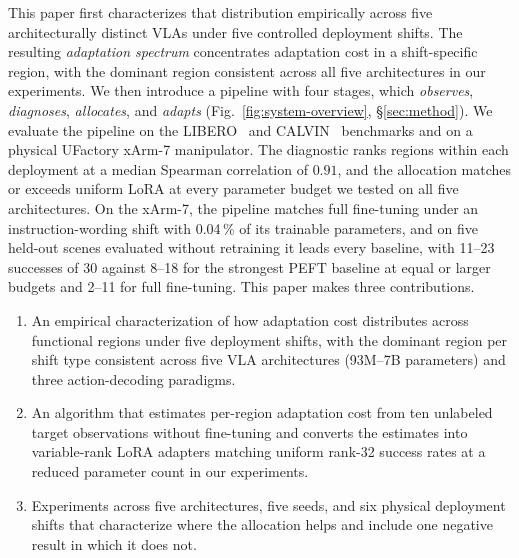 This paper first characterizes that distribution empirically across five architecturally distinct VLAs under five controlled deployment shifts.
The resulting \emph{adaptation spectrum} concentrates adaptation cost in a shift-specific region, with the dominant region consistent across all five architectures in our experiments.
We then introduce a pipeline with four stages, which \emph{observes}, \emph{diagnoses}, \emph{allocates}, and \emph{adapts} (Fig.~\ref{fig:system-overview}, \S\ref{sec:method}).
We evaluate the pipeline on the LIBERO~\cite{Liu2023LIBERO} and CALVIN~\cite{Mees2022CALVIN} benchmarks and on a physical UFactory xArm-7 manipulator.
The diagnostic ranks regions within each deployment at a median Spearman correlation of $0.91$, and the allocation matches or exceeds uniform LoRA at every parameter budget we tested on all five architectures.
On the xArm-7, the pipeline matches full fine-tuning under an instruction-wording shift with 0.04\,\% of its trainable parameters, and on five held-out scenes evaluated without retraining it leads every baseline, with 11--23 successes of 30 against 8--18 for the strongest PEFT baseline at equal or larger budgets and 2--11 for full fine-tuning.
This paper makes three contributions.
\begin{enumerate}[itemsep=2pt, topsep=3pt, partopsep=0pt]
    \item An empirical characterization of how adaptation cost distributes across functional regions under five deployment shifts, with the dominant region per shift type consistent across five VLA architectures (93M--7B parameters) and three action-decoding paradigms.

    \item An algorithm that estimates per-region adaptation cost from ten unlabeled target observations without fine-tuning and converts the estimates into variable-rank LoRA adapters matching uniform rank-32 success rates at a reduced parameter count in our experiments.

    \item Experiments across five architectures, five seeds, and six physical deployment shifts that characterize where the allocation helps and include one negative result in which it does not.
\end{enumerate}